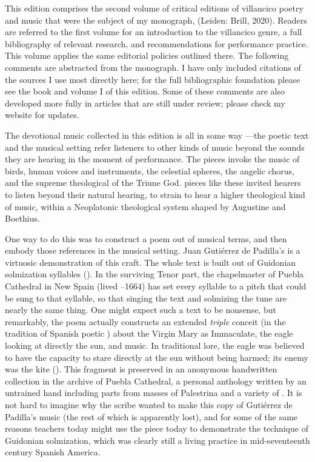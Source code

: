 This edition comprises the second volume of critical editions of villancico
poetry and music that were the subject of my monograph,  (Leiden: Brill, 2020).
Readers are referred to the first volume for an introduction to the
villancico genre, a full bibliography of relevant research, and
recommendations for performance practice.%
    \Autocite{Cashner:WLSCM32}
This volume applies the same editorial policies outlined there.
The following comments are abstracted from the monograph.
I have only included citations of the sources I use most directly here; for
the full bibliographic foundation please see the book and volume I of this
edition.
Some of these comments are also developed more fully in articles that are
still under review; please check my website for updates.

The devotional music collected in this edition is all in some way
---the poetic text and the musical setting refer
listeners to other kinds of music beyond the sounds they are hearing in the
moment of performance.
The pieces invoke the music of birds, human voices and instruments, the
celestial spheres, the angelic chorus, and the supreme theological
 of the Triune God.
 pieces like these invited hearers to listen beyond their
natural hearing, to strain to hear a higher theological kind of music, within
a Neoplatonic theological system shaped by Augustine and Boethius.

One way to do this was to construct a poem out of musical terms, and then
embody those references in the musical setting.
Juan Gutiérrez de Padilla's  is a
virtuosic demonstration of this craft.
The whole text is built out of Guidonian solmization syllables ().
In the surviving Tenor part, the chapelmaster of Puebla Cathedral in New Spain
(lived --1664) has set every syllable to a pitch that could be
sung to that syllable, so that singing the text and solmizing the tune are
nearly the same thing.
One might expect such a text to be nonsense, but remarkably, the poem actually
constructs an extended \emph{triple} conceit (in the tradition of Spanish poetic
) about the Virgin Mary as Immaculate, the eagle looking at
directly the sun, and music.
In traditional lore, the eagle was believed to have the capacity to stare
directly at the sun without being harmed; its enemy was the kite
().%
    \Autocite[]{Covarrubias:Tesoro}
This fragment is preserved in an anonymous handwritten collection in the
archive of Puebla Cathedral, a personal anthology written by an untrained hand
including parts from masses of Palestrina and a variety of .
It is not hard to imagine why the scribe wanted to make this copy of Gutiérrez
de Padilla's music (the rest of which is apparently lost), and for some of the
same reasons teachers today might use the piece today to demonstrate the
technique of Guidonian solmization, which was clearly still a living practice
in mid-seventeenth century Spanish America.

